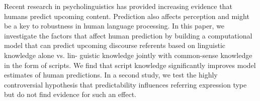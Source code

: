 Recent research in psycholinguistics has provided increasing evidence that humans predict upcoming content. Prediction also affects perception and might be a key to robustness in human language processing. In this paper, we investigate the factors that affect human prediction by building a computational model that can predict upcoming discourse referents based on linguistic knowledge alone vs. lin- guistic knowledge jointly with common-sense knowledge in the form of scripts. We find that script knowledge significantly improves model estimates of human predictions. In a second study, we test the highly controversial hypothesis that predictability influences referring expression type but do not find evidence for such an effect.